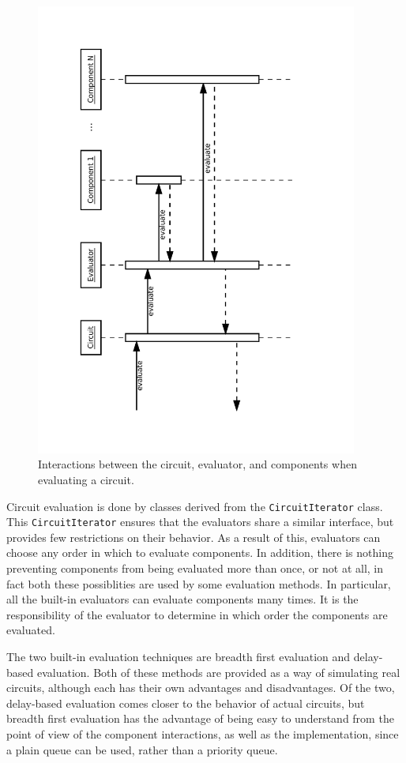 \documentclass{article}
\newcommand{\ClassName}[1]{\texttt{#1}}
\begin{document}
\begin{figure}[H]
    \begin{center}
        \includegraphics[angle=270,width=300pt]{imgs/CircuitEvaluationInteraction.pdf}
    \end{center}
    \caption{Interactions between the circuit, evaluator, and components when evaluating a circuit.}
\end{figure}

Circuit evaluation is done by classes derived from the \ClassName{CircuitIterator} class. This \ClassName{CircuitIterator} ensures that the evaluators share a similar interface, but provides few restrictions on their behavior. As a result of this, evaluators can choose any order in which to evaluate components. In addition, there is nothing preventing components from being evaluated more than once, or not at all, in fact both these possiblities are used by some evaluation methods. In particular, all the built-in evaluators can evaluate components many times. It is the responsibility of the evaluator to determine in which order the components are evaluated.

The two built-in evaluation techniques are breadth first evaluation and delay-based evaluation. Both of these methods are provided as a way of simulating real circuits, although each has their own advantages and disadvantages. Of the two, delay-based evaluation comes closer to the behavior of actual circuits, but breadth first evaluation has the advantage of being easy to understand from the point of view of the component interactions, as well as the implementation, since a plain queue can be used, rather than a priority queue.
\end{document}
